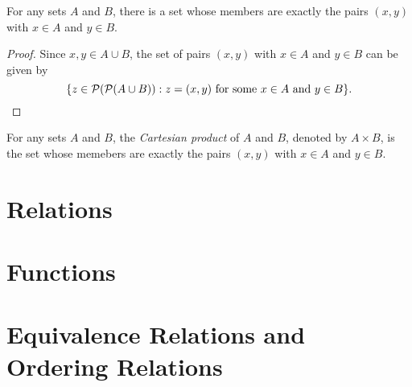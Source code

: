 \begin{theorem}
  For any sets $A$ and $B$, there is a set whose members are exactly the
  pairs $(x, y)$ with $x \in A$ and $y \in B$.
\end{theorem}
\begin{proof}
  Since $x, y \in A \cup B$, the set of pairs $(x, y)$ with $x \in A$ and
  $y \in B$ can be given by
  \begin{equation*}
    \{z \in \mathcal{P}(\mathcal{P}(A \cup B)):
    \text{$z = (x, y)$ for some $x \in A$ and $y \in B$}\}.
    \qedhere
  \end{equation*}
\end{proof}

\begin{definition}
  For any sets $A$ and $B$, the \emph{Cartesian product} of $A$ and $B$,
  denoted by $A \times B$, is the set whose memebers are exactly the pairs
  $(x, y)$ with $x \in A$ and $y \in B$.
\end{definition}

\section{Relations}

\section{Functions}

\section{Equivalence Relations and Ordering Relations}